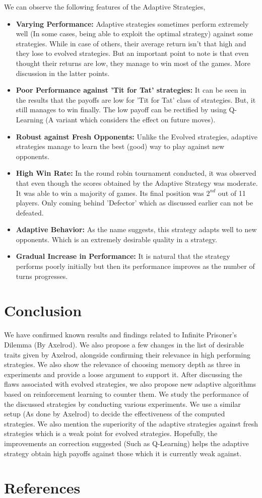 \documentclass[a4paper]{article}
\begin{document}
	We can observe the following features of the Adaptive Strategies,
	\begin{itemize}
		\item \textbf{Varying Performance:} Adaptive strategies sometimes perform extremely well (In some cases, being able to exploit the optimal strategy) against some strategies. While in case of others, their average return isn't that high and they lose to evolved strategies. But an important point to note is that even thought their returns are low, they manage to win most of the games. More discussion in the latter points.
		\item \textbf{Poor Performance against 'Tit for Tat' strategies:} It can be seen in the results that the payoffs are low for 'Tit for Tat' class of strategies. But, it still manages to win finally. The low payoff can be rectified by using Q-Learning (A variant which considers the effect on future moves).
		\item \textbf{Robust against Fresh Opponents:} Unlike the Evolved strategies, adaptive strategies manage to learn the best (good) way to play against new opponents.
		\item \textbf{High Win Rate:} In the round robin tournament conducted, it was observed that even though the scores obtained by the Adaptive Strategy was moderate. It was able to win a majority of games. Its final position was $2^{nd}$ out of 11 players. Only coming behind 'Defector' which as discussed earlier can not be defeated.	
		\item \textbf{Adaptive Behavior:} As the name suggests, this strategy adapts well to new opponents. Which is an extremely desirable quality in a strategy.
		\item \textbf{Gradual Increase in Performance:} It is natural that the strategy performs poorly initially but then its performance improves as the number of turns progresses.				
	\end{itemize}		
	
	\section{Conclusion}	
			
	We have confirmed known results and findings related to Infinite Prisoner's Dilemma (By Axelrod). We also propose a few changes in the list of desirable traits given by Axelrod, alongside confirming their relevance in high performing strategies. We also show the relevance of choosing memory depth as three in experiments and provide a loose argument to support it. After discussing the flaws associated with evolved strategies, we also propose new adaptive algorithms based on reinforcement learning to counter them. We study the performance of the discussed strategies by conducting various experiments. We use a similar setup (As done by Axelrod) to decide the effectiveness of the computed strategies. We also mention the superiority of the adaptive strategies against fresh strategies which is a weak point for evolved strategies. Hopefully, the improvements an correction suggested (Such as Q-Learning) helps the adaptive strategy obtain high payoffs against those which it is currently weak against.
					
	\pagebreak					
					
	\section{References}

	

		
\end{document}
